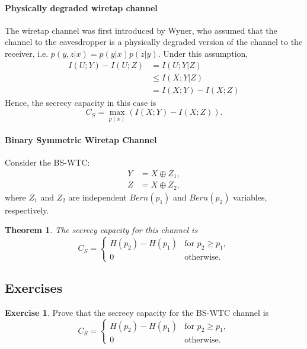 \documentclass[a4paper, 11pt, openany]{book}
\numberwithin{equation}{section}
\theoremstyle{plain}
\newtheorem{theorem}	[equation]	{Theorem}
\theoremstyle{definition}
\newtheorem{exercise}   {Exercise}  [section]
\begin{document}
\paragraph{Physically degraded wiretap channel}


The wiretap channel was first introduced by Wyner, who assumed that the
channel to the eavesdropper is a physically degraded version of the channel to
the receiver, i.e. $p(y, z|x) = p(y|x)p(z|y)$. Under this assumption,
\begin{align*}
I(U; Y ) - I(U;Z) 	&= I(U; Y |Z)\\
					&\le I(X; Y |Z)\\
					&= I(X; Y ) - I(X;Z)
\end{align*}
Hence, the secrecy capacity in this case is
\[
	C_S = \max_{p(x)} (I(X; Y ) - I(X;Z)).
\]




\paragraph{Binary Symmetric Wiretap Channel}

Consider the BS-WTC: 
\begin{align*}
	Y &= X \oplus Z_1,\\
	Z &= X \oplus Z_2,
\end{align*}
where $Z_1$ and $Z_2$ are independent $Bern(p_1)$ and $Bern(p_2)$ variables, respectively.

\begin{theorem} 
The secrecy capacity for this channel is
\[
	C_S = \begin{cases}
		H(p_2) - H(p_1) &\text{for } p_2 \ge p_1,\\
		0 &\text{otherwise}.
	\end{cases}
\]
\end{theorem}


\subsection{Exercises}


\begin{exercise}
Prove that the secrecy capacity for the BS-WTC channel is
\[
	C_S = \begin{cases}
		H(p_2) - H(p_1) &\text{for } p_2 \ge p_1,\\
		0 &\text{otherwise}.
	\end{cases}
\]
\end{exercise}

















\end{document}
